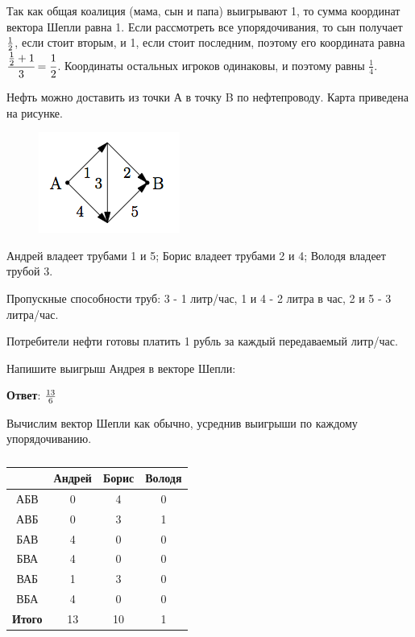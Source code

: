 	\solution
	Так как общая коалиция (мама, сын и папа) выигрывают 1, то сумма координат вектора Шепли равна 1. Если рассмотреть все упорядочивания, то сын получает $1 \over 2$, если стоит вторым, и 1, если стоит последним, поэтому его координата равна $\cfrac{\frac{1}{2}+1}{3} = \cfrac{1}{2}$. Координаты остальных игроков одинаковы, и поэтому равны $\frac{1}{4}$.
	
	\task
	Нефть можно доставить из точки А в точку B по нефтепроводу. Карта приведена на рисунке.
	
	\begin{figure}
		\centering
		\includegraphics[width=\linewidth]{week6-control-1}
		\caption{}
		\label{fig:week6-control-2}
	\end{figure}
	
	Андрей владеет трубами 1 и 5; Борис владеет трубами 2 и 4; Володя владеет трубой 3.
	
	Пропускные способности труб: 3 - 1 литр/час, 1 и 4 - 2 литра в час, 2 и 5 - 3 литра/час.
	
	Потребители нефти готовы платить 1 рубль за каждый передаваемый литр/час.
	
	Напишите выигрыш Андрея в векторе Шепли:
	
	\textbf{Ответ}: $13 \over 6$
	
	\solution
	\label{week6-control-2:tube}
	Вычислим вектор Шепли как обычно, усреднив выигрыши по каждому упорядочиванию.
	
	\begin{table}[h]
		\label{week6-control2:table1}
		\caption{}
		\centering
	\begin{tabular}{|c|c|c|c|}
		\hline 
		& Андрей & Борис & Володя \\ 
		\hline 
		АБВ & 0 & 4 & 0 \\ 
		\hline 
		АВБ & 0 & 3 & 1 \\ 
		\hline 
		БАВ & 4 & 0 & 0 \\ 
		\hline 
		БВА & 4 & 0 & 0 \\ 
		\hline 
		ВАБ & 1 & 3 & 0 \\ 
		\hline 
		ВБА & 4 & 0 & 0 \\ 
		\hline
		\textbf{Итого} & 13 & 10 & 1 \\
		\hline
	\end{tabular}
	\end{table}

